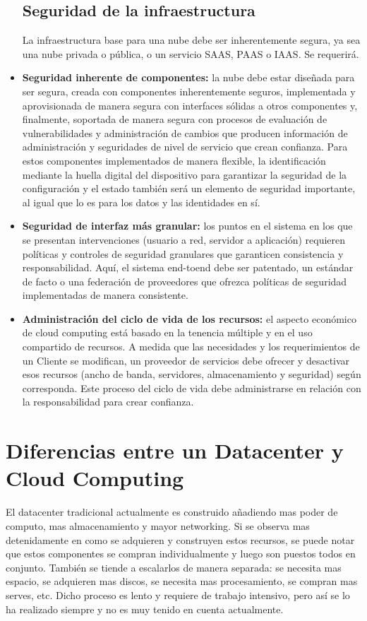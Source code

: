 \documentclass[12pt,a4paper]{article}
\begin{document}
\begin{itemize}
\subsection{Seguridad de la infraestructura}
La infraestructura base para una nube debe ser
inherentemente segura, ya sea una nube privada o pública,
o un servicio SAAS, PAAS o IAAS. Se requerirá.
\item \textbf{Seguridad inherente de componentes:} la nube debe
estar diseñada para ser segura, creada con componentes
inherentemente seguros, implementada y aprovisionada
de manera segura con interfaces sólidas a otros
componentes y, finalmente, soportada de manera
segura con procesos de evaluación de vulnerabilidades
y administración de cambios que producen información
de administración y seguridades de nivel de servicio que
crean confianza. Para estos componentes implementados
de manera flexible, la identificación mediante la huella
digital del dispositivo para garantizar la seguridad de la
configuración y el estado también será un elemento de
seguridad importante, al igual que lo es para los datos
y las identidades en sí.
\item \textbf{Seguridad de interfaz más granular:} los puntos en
el sistema en los que se presentan intervenciones
(usuario a red, servidor a aplicación) requieren políticas
y controles de seguridad granulares que garanticen
consistencia y responsabilidad. Aquí, el sistema end-toend debe ser patentado, un estándar de facto o una
federación de proveedores que ofrezca políticas de
seguridad implementadas de manera consistente.
\item \textbf{Administración del ciclo de vida de los recursos:} el aspecto
económico de cloud computing está basado en la tenencia
múltiple y en el uso compartido de recursos. A medida que
las necesidades y los requerimientos de un Cliente se
modifican, un proveedor de servicios debe ofrecer y
desactivar esos recursos (ancho de banda, servidores,
almacenamiento y seguridad) según corresponda. Este
proceso del ciclo de vida debe administrarse en relación
con la responsabilidad para crear confianza.

\end{itemize}

\section{Diferencias entre un Datacenter y Cloud Computing}
El datacenter tradicional actualmente es construido añadiendo mas poder de computo, mas 
almacenamiento y mayor networking. Si se observa mas detenidamente en como se adquieren y construyen 
estos recursos, se puede notar que estos componentes se compran individualmente y luego son puestos 
todos en conjunto. También se tiende a escalarlos de manera separada: se necesita mas espacio, se 
adquieren mas discos, se necesita mas procesamiento, se compran mas serves, etc. Dicho proceso es 
lento y requiere de trabajo intensivo, pero así se lo ha realizado siempre y no es muy tenido en 
cuenta actualmente.
\end{document}
